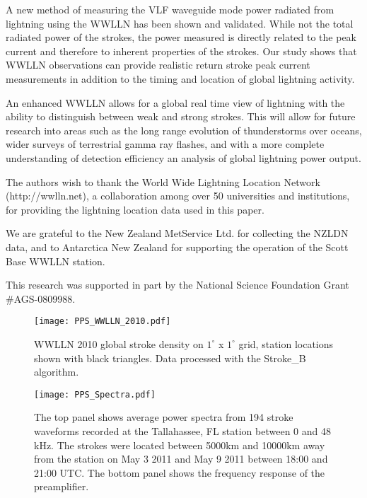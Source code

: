 \documentclass[12pt]{article}
\begin{document}
A new method of measuring the VLF waveguide mode power radiated from lightning using the WWLLN has been shown and validated. While not the total radiated power of the strokes, the power measured is directly related to the peak current and therefore to inherent properties of the strokes. Our study shows that WWLLN observations can provide realistic return stroke peak current measurements in addition to the timing and location of global lightning activity.

An enhanced WWLLN allows for a global real time view of lightning with the ability to distinguish between weak and strong strokes. This will allow for future research into areas such as the long range evolution of thunderstorms over oceans, wider surveys of terrestrial gamma ray flashes, and with a more complete understanding of detection efficiency an analysis of global lightning power output.


\begin{acknowledgment} 
The authors wish to thank the World Wide Lightning Location Network (http://wwlln.net), a collaboration among over 50 universities and institutions, for providing the lightning location data used in this paper.

We are grateful to the New Zealand MetService Ltd. for collecting the NZLDN data, and to Antarctica New Zealand for supporting the operation of the Scott Base WWLLN station.

This research was supported in part by the National Science Foundation Grant \#AGS-0809988.
\end{acknowledgment}

{}
{\clearpage}





 \begin{figure*}[b]
 \noindent\texttt{[image: PPS\_WWLLN\_2010.pdf]}\\
 \caption{WWLLN 2010 global stroke density on $1^\circ$ x $1^\circ$ grid, station locations shown with black triangles. Data processed with the Stroke\_B algorithm.}
 \label{wwlln_dist}
 \end{figure*}
 
 \begin{figure*}[t]
 \noindent\texttt{[image: PPS\_Spectra.pdf]}\\
 \caption{The top panel shows average power spectra from 194 stroke waveforms recorded at the Tallahassee, FL station between 0 and 48 kHz. The strokes were located between 5000km and 10000km away from the  station on May 3 2011 and May 9 2011 between 18:00 and 21:00 UTC. The bottom panel shows the frequency response of the preamplifier.}
 \label{average_spectra}
 \end{figure*}
\end{document}
